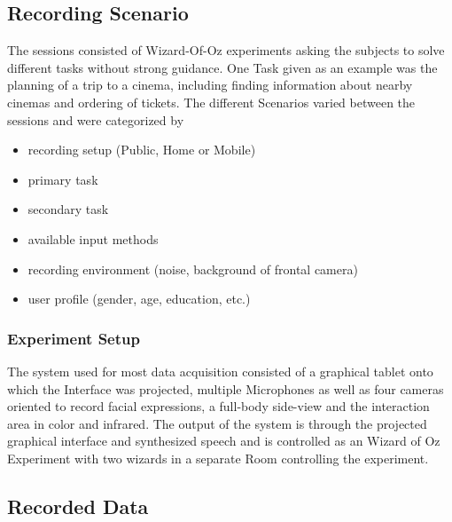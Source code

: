 \documentclass[a4paper]{article}
\begin{document}
		\subsection{Recording Scenario}
			The sessions consisted of  Wizard-Of-Oz experiments asking the subjects to solve different tasks without strong guidance. One Task given as an example was the planning of a trip to a cinema, including finding information about nearby cinemas and ordering of tickets. The different Scenarios varied between the sessions and were categorized by
			\begin{itemize}
				\item recording setup (Public, Home or Mobile)
				\item primary task
				\item secondary task
				\item available input methods
				\item recording environment (noise, background of frontal camera)
				\item user profile (gender, age, education, etc.)
			\end{itemize}
		\subsubsection{Experiment Setup}
				The system used for most data acquisition consisted of a graphical tablet onto which the Interface was projected, multiple Microphones as well as four cameras oriented to record facial expressions, a full-body side-view and the interaction area in color and infrared. The output of the system is through the projected graphical interface and synthesized speech and is controlled as an Wizard of Oz Experiment with two wizards in a separate Room controlling the experiment. 
				
		\subsection{Recorded Data}
		
\end{document}
